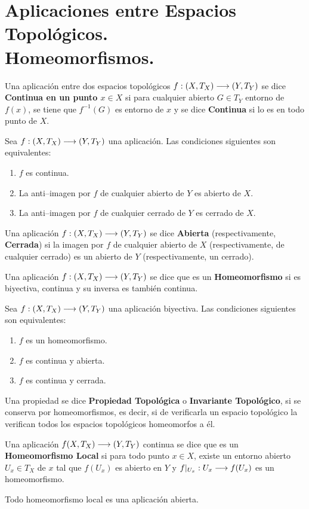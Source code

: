 \documentclass[cursovd_portada.tex]{subfiles}
\begin{document}
\section{Aplicaciones entre Espacios Topológicos.\\ Homeomorfismos.}
\begin{defi}
Una aplicación entre dos espacios topológicos $f:(X,T_X)\longrightarrow (Y,T_Y)$ se dice {\bf Continua en un punto $x\in X$}
si para cualquier abierto $G\in T_Y$ entorno de $f(x)$, se tiene que $f^{-1}(G)$ es entorno de $x$ y se dice {\bf
Continua} si lo es en todo punto de $X$.
\end{defi}
\begin{teorema}
Sea $f:(X,T_X)\longrightarrow (Y,T_Y)$ una aplicación. Las condiciones siguientes son equivalentes:
\begin{enumerate}
\item $f$ es continua.
\item La anti--imagen por $f$ de cualquier abierto de $Y$ es abierto de $X$.
\item La anti--imagen por $f$ de cualquier cerrado de $Y$ es cerrado de $X$.
\end{enumerate}
\end{teorema}
\begin{defi}
Una aplicación $f:(X,T_X)\longrightarrow (Y,T_Y)$ se dice {\bf Abierta} (respectivamente, {\bf Cerrada}) si la imagen por $f$
de cualquier abierto de $X$ (respectivamente, de cualquier cerrado) es un abierto de $Y$ (respectivamente, un
cerrado).
\end{defi}
\begin{defi} Una aplicación $f:(X,T_X)\longrightarrow (Y,T_Y)$ se dice que es un {\bf Homeomorfismo} si es biyectiva, continua
y su inversa es también continua.
\end{defi}
\begin{teorema}
Sea $f:(X,T_X)\longrightarrow (Y,T_Y)$ una aplicación biyectiva. Las condiciones siguientes son equivalentes:
\begin{enumerate}
\item $f$ es un homeomorfismo.
\item $f$ es continua y abierta.
\item $f$ es continua y cerrada.
\end{enumerate}
\end{teorema}
\begin{defi} Una propiedad se dice {\bf Propiedad Topológica} o {\bf Invariante Topológico}, si se conserva por
homeomorfismos, es decir, si de verificarla un espacio topológico la verifican todos los espacios topológicos
homeomorfos a él.
\end{defi}
\begin{defi}
Una aplicación $f(X,T_X)\longrightarrow (Y,T_Y)$ continua se dice que es un {\bf Homeomorfismo Local} si para todo punto $x\in
X$, existe un entorno abierto $U_x\in T_X$ de $x$ tal que $f(U_x)$ es abierto en $Y$ y $f|_{U_x}:U_x\longrightarrow f(U_x)$ es
un homeomorfismo.
\end{defi}
\begin{prop}
Todo homeomorfismo local es una aplicación abierta.
\end{prop}
\end{document}
